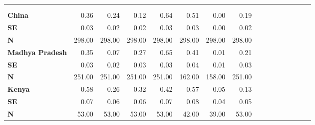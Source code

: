 \begin{tabular}{@{\extracolsep{5pt}}lrrrrrrrrrrrrrrr}
\toprule
&  &  &  &  &  &  &  \\
{\bf } &  &  &  &  &  &  &  \\
\hline
{\bf China} & 0.36\phantom{***} & 0.24\phantom{***} & 0.12\phantom{***} & 0.64\phantom{***} & 0.51\phantom{***} & 0.00\phantom{***} & 0.19\phantom{***} \\
{\bf SE} & 0.03\phantom{***} & 0.02\phantom{***} & 0.02\phantom{***} & 0.03\phantom{***} & 0.03\phantom{***} & 0.00\phantom{***} & 0.02\phantom{***} \\
{\bf N} & 298.00\phantom{***} & 298.00\phantom{***} & 298.00\phantom{***} & 298.00\phantom{***} & 298.00\phantom{***} & 298.00\phantom{***} & 298.00\phantom{***} \\
{\bf Madhya Pradesh} & 0.35\phantom{***} & 0.07\phantom{***} & 0.27\phantom{***} & 0.65\phantom{***} & 0.41\phantom{***} & 0.01\phantom{***} & 0.21\phantom{***} \\
{\bf SE} & 0.03\phantom{***} & 0.02\phantom{***} & 0.03\phantom{***} & 0.03\phantom{***} & 0.04\phantom{***} & 0.01\phantom{***} & 0.03\phantom{***} \\
{\bf N} & 251.00\phantom{***} & 251.00\phantom{***} & 251.00\phantom{***} & 251.00\phantom{***} & 162.00\phantom{***} & 158.00\phantom{***} & 251.00\phantom{***} \\
{\bf Kenya} & 0.58\phantom{***} & 0.26\phantom{***} & 0.32\phantom{***} & 0.42\phantom{***} & 0.57\phantom{***} & 0.05\phantom{***} & 0.13\phantom{***} \\
{\bf SE} & 0.07\phantom{***} & 0.06\phantom{***} & 0.06\phantom{***} & 0.07\phantom{***} & 0.08\phantom{***} & 0.04\phantom{***} & 0.05\phantom{***} \\
{\bf N} & 53.00\phantom{***} & 53.00\phantom{***} & 53.00\phantom{***} & 53.00\phantom{***} & 42.00\phantom{***} & 39.00\phantom{***} & 53.00\phantom{***} \\
\hline
\end{tabular}
